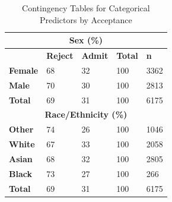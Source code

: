 \documentclass[titlepage]{article}   	%
\begin{document}
\begin{table}[]
\centering
\caption{Contingency Tables for Categorical Predictors by Acceptance}
\label{my-label}
\begin{tabular}{@{}lllll@{}}
\toprule
\multicolumn{5}{c}{\textbf{Sex (\%)}}                                            \\ \midrule
                & \textbf{Reject} & \textbf{Admit} & \textbf{Total} & \textbf{n} \\
\textbf{Female} & 68              & 32             & 100            & 3362       \\
\textbf{Male}   & 70              & 30             & 100            & 2813       \\
\textbf{Total}  & 69              & 31             & 100            & 6175       \\ \midrule
\multicolumn{5}{c}{\textbf{Race/Ethnicity (\%)}}                                 \\ \midrule
\textbf{Other}  & 74              & 26             & 100            & 1046       \\
\textbf{White}  & 67              & 33             & 100            & 2058       \\
\textbf{Asian}  & 68              & 32             & 100            & 2805       \\
\textbf{Black}  & 73              & 27             & 100            & 266        \\
\textbf{Total}  & 69              & 31             & 100            & 6175       \\ 
\bottomrule
\end{tabular}
\end{table}
\end{document}
